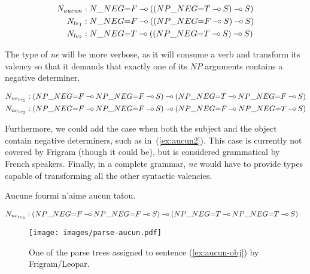 \begin{align*}
N_{aucun} &: N\_NEG{=}F \mathbin{{-}\mkern-3.5mu{\circ}} ((NP\_NEG{=}T \mathbin{{-}\mkern-3.5mu{\circ}} S) \mathbin{{-}\mkern-3.5mu{\circ}} S) \\
N_{le_1} &: N\_NEG{=}F \mathbin{{-}\mkern-3.5mu{\circ}} ((NP\_NEG{=}F \mathbin{{-}\mkern-3.5mu{\circ}} S) \mathbin{{-}\mkern-3.5mu{\circ}} S) \\
N_{le_2} &: N\_NEG{=}T \mathbin{{-}\mkern-3.5mu{\circ}} ((NP\_NEG{=}T \mathbin{{-}\mkern-3.5mu{\circ}} S) \mathbin{{-}\mkern-3.5mu{\circ}} S) \\
\end{align*}

The type of \emph{ne} will be more verbose, as it will consume a verb
and transform its valency so that it demands that exactly one of its
$NP$ arguments contains a negative determiner.

\begin{align*}
N_{ne_{tv_1}} &: (NP\_NEG{=}F \mathbin{{-}\mkern-3.5mu{\circ}} NP\_NEG{=}F \mathbin{{-}\mkern-3.5mu{\circ}} S) \mathbin{{-}\mkern-3.5mu{\circ}} (NP\_NEG{=}T \mathbin{{-}\mkern-3.5mu{\circ}} NP\_NEG{=}F \mathbin{{-}\mkern-3.5mu{\circ}} S) \\
N_{ne_{tv_2}} &: (NP\_NEG{=}F \mathbin{{-}\mkern-3.5mu{\circ}} NP\_NEG{=}F \mathbin{{-}\mkern-3.5mu{\circ}} S) \mathbin{{-}\mkern-3.5mu{\circ}} (NP\_NEG{=}F \mathbin{{-}\mkern-3.5mu{\circ}} NP\_NEG{=}T \mathbin{{-}\mkern-3.5mu{\circ}} S)
\end{align*}

Furthermore, we could add the case when both the subject and the object
contain negative determiners, such as in~(\ref{ex:aucun2}). This case is
currently not covered by Frigram (though it could be), but is considered
grammatical by French speakers. Finally, in a complete grammar,
\emph{ne} would have to provide types capable of transforming all the
other syntactic valencies.

\begin{exe}
  \ex \label{ex:aucun2} Aucune fourmi n'aime aucun tatou.
\end{exe}

\begin{align*}
N_{ne_{tv_3}} &: (NP\_NEG{=}F \mathbin{{-}\mkern-3.5mu{\circ}} NP\_NEG{=}F \mathbin{{-}\mkern-3.5mu{\circ}} S) \mathbin{{-}\mkern-3.5mu{\circ}} (NP\_NEG{=}T \mathbin{{-}\mkern-3.5mu{\circ}} NP\_NEG{=}T \mathbin{{-}\mkern-3.5mu{\circ}} S)
\end{align*}

\begin{figure}
  \centering
  \texttt{[image: images/parse-aucun.pdf]}
  \caption{\label{fig:parse-aucun} One of the parse trees assigned to
    sentence (\ref{ex:aucun-obj}) by Frigram/Leopar.}
\end{figure}

